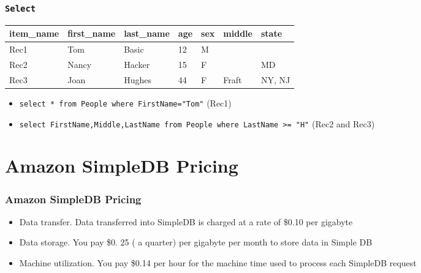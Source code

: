 \documentclass{beamer}
\begin{document}
\begin{frame}[fragile]
\frametitle{\texttt{Select}}
\begin{tabular}{|l|l|l|l|l|l|l|} \hline
item\_name & first\_name & last\_name & age & sex & middle & state \\ \hline
Rec1 & Tom & Basic & 12 & M & & \\ \hline
Rec2 & Nancy & Hacker & 15 & F & & MD \\ \hline 
Rec3 & Joan & Hughes & 44 & F & Fraft & NY, NJ\\ \hline 
\end{tabular} 

\begin{itemize}
 \item \texttt{select * from People where FirstName="Tom"} (Rec1)
 \item \texttt{select FirstName,Middle,LastName from People where LastName >= "H"} (Rec2 and Rec3)
 \end{itemize}
\end{frame}
\section{Amazon SimpleDB Pricing}
\begin{frame}[fragile]
\frametitle{Amazon SimpleDB Pricing}

\begin{itemize}
 \item Data transfer. Data transferred into SimpleDB is charged at a rate of \$0.10 per gigabyte
 \item Data storage. You pay \$0. 25 ( a quarter) per gigabyte per month to store data in Simple DB
 \item Machine utilization. You pay \$0.14 per hour for the machine time used to process each SimpleDB
request
 \end{itemize}
\end{frame}

\end{document}
